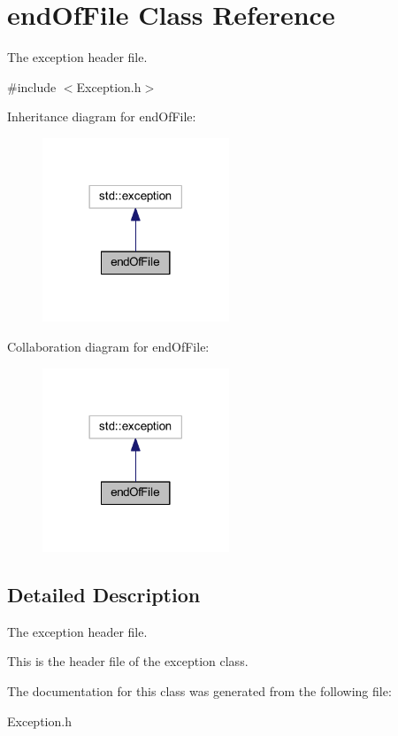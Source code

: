 \hypertarget{classend_of_file}{\section{end\+Of\+File Class Reference}
\label{classend_of_file}
}


The exception header file.  




{\ttfamily \#include $<$Exception.\+h$>$}



Inheritance diagram for end\+Of\+File\+:\nopagebreak
\begin{figure}[H]
\begin{center}
\leavevmode
\includegraphics[width=158pt]{classend_of_file__inherit__graph}
\end{center}
\end{figure}


Collaboration diagram for end\+Of\+File\+:\nopagebreak
\begin{figure}[H]
\begin{center}
\leavevmode
\includegraphics[width=158pt]{classend_of_file__coll__graph}
\end{center}
\end{figure}


\subsection{Detailed Description}
The exception header file. 

This is the header file of the exception class. 

The documentation for this class was generated from the following file\+:\begin{DoxyCompactItemize}
\item 
Exception.\+h\end{DoxyCompactItemize}
